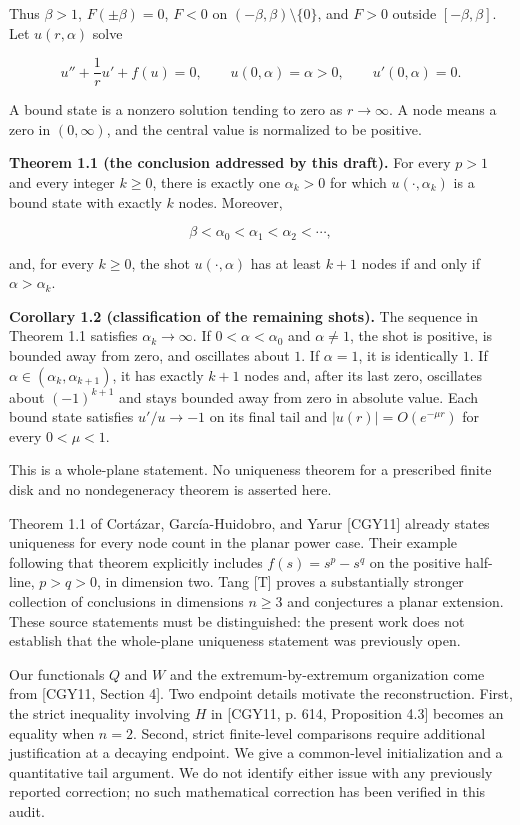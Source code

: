 \documentclass[11pt]{article}
\begin{document}
Thus \(\beta>1\), \(F(\pm\beta)=0\), \(F<0\) on
\((-\beta,\beta)\setminus\{0\}\), and \(F>0\) outside
\([-\beta,\beta]\). Let \(u(r,\alpha)\) solve

\[
u''+\frac1r u'+f(u)=0,\qquad u(0,\alpha)=\alpha>0,
\qquad u'(0,\alpha)=0. \tag{1.1}
\]

A bound state is a nonzero solution tending to zero as \(r\to\infty\). A
node means a zero in \((0,\infty)\), and the central value is normalized
to be positive.

\textbf{Theorem 1.1 (the conclusion addressed by this draft).} For every
\(p>1\) and every integer \(k\geq0\), there is exactly one
\(\alpha_k>0\) for which \(u(\cdot,\alpha_k)\) is a bound state with
exactly \(k\) nodes. Moreover,

\[\beta<\alpha_0<\alpha_1<\alpha_2<\cdots,\]

and, for every \(k\geq0\), the shot \(u(\cdot,\alpha)\) has at least
\(k+1\) nodes if and only if \(\alpha>\alpha_k\).

\textbf{Corollary 1.2 (classification of the remaining shots).} The
sequence in Theorem 1.1 satisfies \(\alpha_k\to\infty\). If
\(0<\alpha<\alpha_0\) and \(\alpha\ne1\), the shot is positive, is
bounded away from zero, and oscillates about \(1\). If \(\alpha=1\), it
is identically \(1\). If \(\alpha\in(\alpha_k,\alpha_{k+1})\), it has
exactly \(k+1\) nodes and, after its last zero, oscillates about
\((-1)^{k+1}\) and stays bounded away from zero in absolute value. Each
bound state satisfies \(u'/u\to-1\) on its final tail and
\(|u(r)|=O(e^{-\mu r})\) for every \(0<\mu<1\).

This is a whole-plane statement. No uniqueness theorem for a prescribed
finite disk and no nondegeneracy theorem is asserted here.

Theorem 1.1 of Cortázar, García-Huidobro, and Yarur {[}CGY11{]} already
states uniqueness for every node count in the planar power case. Their
example following that theorem explicitly includes \(f(s)=s^p-s^q\) on
the positive half-line, \(p>q>0\), in dimension two. Tang {[}T{]} proves
a substantially stronger collection of conclusions in dimensions
\(n\geq3\) and conjectures a planar extension. These source statements
must be distinguished: the present work does not establish that the
whole-plane uniqueness statement was previously open.

Our functionals \(Q\) and \(W\) and the extremum-by-extremum
organization come from {[}CGY11, Section 4{]}. Two endpoint details
motivate the reconstruction. First, the strict inequality involving
\(H\) in {[}CGY11, p. 614, Proposition 4.3{]} becomes an equality when
\(n=2\). Second, strict finite-level comparisons require additional
justification at a decaying endpoint. We give a common-level
initialization and a quantitative tail argument. We do not identify
either issue with any previously reported correction; no such
mathematical correction has been verified in this audit.
\end{document}

